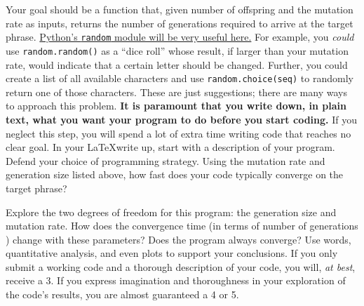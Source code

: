 \documentclass[12pt, letterpaper]{article}
\begin{document}
Your goal should be a function that, given number of offspring and the
mutation rate as inputs, returns the number of generations required to arrive
at the target phrase.  \href{http://docs.python.org/2/library/random.html}
{Python's {\tt random} module will be very useful here.}  For example, you
\emph{could} use {\tt random.random()} as a ``dice roll'' whose result, if
larger than your mutation rate, would indicate that a certain letter should
be changed.  Further, you could create a list of all available characters
and use {\tt random.choice(seq)} to randomly return one of those characters.
These are just suggestions; there are many ways to approach this problem.
\textbf{It is paramount that you write down, in plain text, what you want
  your program to do before you start coding.}  If you neglect this step, you
will spend a lot of extra time writing code that reaches no clear goal.
In your \LaTeX write up, start with a description of your program.  Defend
your choice of programming strategy.  Using the mutation rate and generation
size listed above, how fast does your code typically converge on the target
phrase?  

Explore the two degrees of freedom for this program: the generation size and
mutation rate.  How does the convergence time (in terms of number of generations
) change with these parameters?  Does the program always converge?  Use words,
quantitative analysis, and even plots to support your conclusions.  If you only
submit a working code and a thorough description of your code, you will, 
\emph{at best}, receive a 3.  If you express imagination and thoroughness in 
your exploration of the code's results, you are almost guaranteed a 4 or 5.
\end{document}
